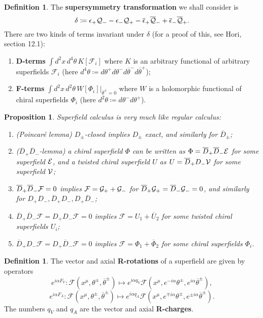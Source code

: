 \documentclass{report}
\theoremstyle{plain}
\newtheorem{proposition}[theorem]{Proposition}
\theoremstyle{definition}
\newtheorem{definition}[theorem]{Definition}
\theoremstyle{remark}
\newcommand{\cF}{\mathcal{F}}
\newcommand{\cnj}{\overline}
\begin{document}
\begin{definition}
  The {\bf supersymmetry transformation} we shall consider is
  \[ \delta \coloneqq \epsilon_+ \cal Q_- - \epsilon_- \cal Q_+ - \cnj\epsilon_+ \cnj{\cal Q}_- + \cnj\epsilon_- \cnj{\cal Q}_+. \]
  There are two kinds of terms invariant under $\delta$ (for a proof
  of this, see Hori, section 12.1):
  \begin{enumerate}
  \item {\bf D-terms} $\int d^2x \, d^4\theta \, K[\cF_i]$ where $K$
    is an arbitrary functional of arbitrary superfields $\cF_i$ (here
    $d^4\theta \coloneqq d\theta^+ d\theta^- d\cnj\theta^-
    d\cnj\theta^+$);
  \item {\bf F-terms} $\int d^2x \, d^2\theta \,
    W[\Phi_i]|_{\cnj\theta^\pm=0}$ where $W$ is a holomorphic
    functional of chiral superfields $\Phi_i$ (here $d^2\theta
    \coloneqq d\theta^- d\theta^+$).
  \end{enumerate}
\end{definition}

\begin{proposition}
  Superfield calculus is very much like regular calculus:
  \begin{enumerate}
  \item (Poincar\'e lemma) $D_\pm$-closed implies $D_\pm$ exact, and
    similarly for $\cnj D_\pm$;
  \item ($\cnj D_+ \cnj D_-$-lemma) a chiral superfield $\Phi$ can be
    written as $\Phi = \cnj D_+ \cnj D_- \cal E$ for some superfield
    $\cal E$, and a twisted chiral superfield $U$ as $U = \cnj D_+ D_-
    \cal V$ for some superfield $\cal V$;
  \item $\cnj D_+ \cnj D_- {\cal F} = 0$ implies $\cal F = \cal G_+ +
    \cal G_-$ for $\cnj D_+ {\cal G}_+ = \cnj D_- {\cal G}_- = 0$, and
    similarly for $D_+D_-, \cnj D_+ D_-, D_+ \cnj D_-$;
  \item $\cnj D_+ \cnj D_- \cF = D_+ D_- \cF = 0$ implies $\cF = U_1 +
    \cnj U_2$ for some twisted chiral superfields $U_i$;
  \item $\cnj D_+ D_- \cF = D_+ \cnj D_- \cF = 0$ implies $\cF =
    \Phi_1 + \cnj \Phi_2$ for some chiral superfields $\Phi_i$.
  \end{enumerate}
\end{proposition}

\begin{definition} \label{def:r-rotations}
  The vector and axial {\bf R-rotations} of a superfield are given by
  operators
  \[ e^{i\alpha F_V}\colon \cF(x^\mu, \theta^\pm, \cnj\theta^\pm) \mapsto e^{i\alpha q_V} \cF(x^\mu, e^{-i\alpha} \theta^\pm, e^{i\alpha} \cnj\theta^\pm), \]
  \[ e^{i\alpha F_A}\colon \cF(x^\mu, \theta^\pm, \cnj\theta^\pm) \mapsto e^{i\alpha q_A} \cF(x^\mu, e^{\mp i\alpha} \theta^\pm, e^{\pm i\alpha} \cnj\theta^\pm). \]
  The numbers $q_V$ and $q_A$ are the vector and axial {\bf
    R-charges}.
\end{definition}
\end{document}
